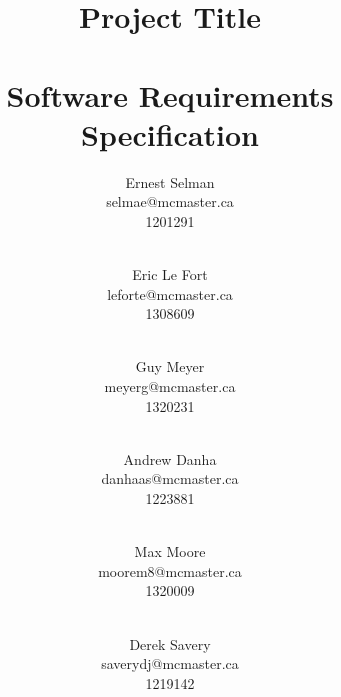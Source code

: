 \documentclass[titlepage]{article}
\title{Project Title\\~\\Software Requirements Specification}
\author{
	Ernest Selman\\selmae@mcmaster.ca\\1201291\\~\\\and
	Eric Le Fort\\leforte@mcmaster.ca\\1308609\\~\\\and
	Guy Meyer\\meyerg@mcmaster.ca\\1320231\\~\\\and
	Andrew Danha\\danhaas@mcmaster.ca\\1223881\\~\\\and
	Max Moore\\moorem8@mcmaster.ca\\1320009\\~\\\and
	Derek Savery\\saverydj@mcmaster.ca\\1219142\\~\\
}
\begin{document}
\maketitle


\tableofcontents
~\\[15mm]
\listoftables




\end{document}
